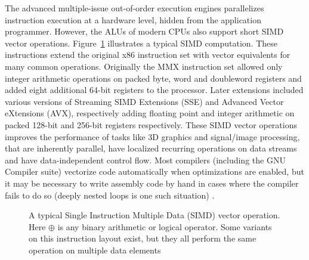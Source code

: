 The advanced multiple-issue out-of-order execution engines parallelizes instruction execution at a hardware level, hidden from the application programmer. However, the ALUs of modern CPUs also support short 
SIMD vector operations. Figure~\ref{fig_SIMD} illustrates a typical SIMD computation. These instructions extend the original x86 instruction set with vector equivalents for many common operations. Originally
the MMX instruction set allowed only integer arithmetic operations on packed byte, word and doubleword registers and added eight additional 64-bit registers to the processor. Later extensions included 
various versions of Streaming SIMD Extensions (SSE) and Advanced Vector eXtensions (AVX), respectively adding floating point and integer arithmetic on packed 128-bit and 256-bit registers respectively. These
SIMD vector operations improves the performance of tasks like 3D graphics and signal/image processing, that are inherently parallel, have localized recurring operations on data streams and have data-independent 
control flow. Most compilers (including the GNU Compiler suite) vectorize code automatically when optimizations are enabled, but it may be necessary to write assembly code by hand in cases where the compiler fails
to do so (deeply nested loops is one such situation) \cite{intelArch}.
\begin{figure}[ht!]
 \begin{mdframed}
 \centering
 \caption[Vector operation]{A typical Single Instruction Multiple Data (SIMD) vector operation. Here $\oplus$ is any binary arithmetic or logical operator. Some variants on this instruction layout exist, but they all perform the same operation
			    on multiple data elements}
 \label{fig_SIMD}
 \end{mdframed}
\end{figure}

